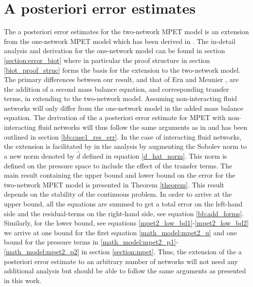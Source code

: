 \section{A posteriori error estimates} \label{section:a_posteriori}
The a posteriori error estimates for the two-network MPET model is an extension from the one-network MPET model which has been derived in \cite{meunier}. The in-detail analysis and derivation for the one-network model can be found in section \ref{section:error_biot} where in particular the proof structure in section \ref{biot_proof_struc} forms the basis for the extension to the two-network model. The primary differences between our result, and that of Ern and Meunier \cite{meunier}, are the addition of a second mass balance equation, and corresponding transfer terms, in extending to the two-network model. Assuming non-interacting fluid networks will only differ from the one-network model in the added mass balance equation. The derivation of the a posteriori error estimate for MPET with non-interacting fluid networks will thus follow the same arguments as in \cite{meunier} and has been outlined in section \ref{bb:case1_res_err}. In the case of interacting fluid networks, the extension is facilitated by in the analysis by augmenting the Sobolev norm to a new norm denoted by $\hat{d}$ defined in equation \eqref{d_hat_norm}. This norm is defined on the pressure space to include the effect of the transfer terms. The main result containing the upper bound and lower bound on the error for the two-network MPET model is presented in Theorem \ref{theorem}. This result depends on the stability of the continuous problem. In order to arrive at the upper bound, all the equations are summed to get a total error on the left-hand side and the residual-terms on the right-hand side, see equation \eqref{bb:add_forms}. Similarly, for the lower bound, see equations \eqref{mpet2_low_bd1}-\eqref{mpet2_low_bd2} we arrive at one bound for the first equation \eqref{math_model:mpet2_u} and one bound for the pressure terms in \eqref{math_model:mpet2_p1}-\eqref{math_model:mpet2_p2} in section \ref{section:mpet}. Thus, the extension of the a posteriori error estimate to an arbitrary number of networks will not need any additional analysis but should be able to follow the same arguments as presented in this work. 
\\
\\
